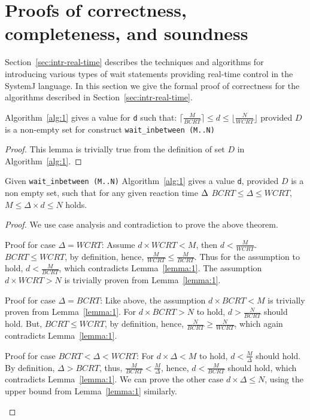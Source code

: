 \section{Proofs of correctness, completeness, and soundness}
\label{sec:proof-correctness}

Section~\ref{sec:intr-real-time} describes the techniques and algorithms
for introducing various types of wait statements providing real-time
control in the SystemJ language. In this section we give the formal
proof of correctness for the algorithms described in
Section~\ref{sec:intr-real-time}.

\begin{lemma}
  Algorithm~\ref{alg:1} gives a value for \texttt{d} such that: $\lceil
  \frac{M}{BCRT} \rceil \leq d \leq \lfloor \frac{N}{WCRT} \rfloor$
  provided $D$ is a non-empty set for construct \texttt{wait\_inbetween
    (M..N)}
\label{lemma:1}
\end{lemma}
\begin{proof}
  This lemma is trivially true from the definition of set $D$ in
  Algorithm~\ref{alg:1}.
\end{proof}

\begin{theorem}
  Given \texttt{wait\_inbetween (M..N)} Algorithm~\ref{alg:1} gives a
  value \texttt{d}, provided $D$ is a non empty set, such that for any
  given reaction time $\textcolor{black}{\Delta}$  $BCRT \leq
  \Delta \leq WCRT$, $M \leq \Delta \times d \leq N$ holds.
\label{th:1}
\end{theorem}
\begin{proof}
  We use case analysis and contradiction to prove the above theorem.
  \begin{compactenum}[\hspace{0.25cm} 1.]
  \item Proof for case $\Delta = WCRT$: Assume \mbox{$d \times WCRT <
      M$}, then $d < \frac{M}{WCRT}$. $BCRT \leq WCRT$, by definition,
    hence, $\frac{M}{WCRT} \leq \frac{M}{BCRT}$. Thus for the assumption
    to hold, $d < \frac{M}{BCRT}$, which contradicts
    Lemma~\ref{lemma:1}. The assumption $d \times WCRT >N$ is trivially
    proven from Lemma~\ref{lemma:1}.
  \item Proof for case $\Delta = BCRT$: Like above, the assumption $d
    \times BCRT < M$ is trivially proven from Lemma~\ref{lemma:1}. For
    $d \times BCRT > N$ to hold, $d > \frac{N}{BCRT}$ should hold. But,
    $BCRT \leq WCRT$, by definition, hence, $\frac{N}{BCRT} \geq
    \frac{N}{WCRT}$, which again contradicts Lemma~\ref{lemma:1}.
  \item Proof for case $BCRT < \Delta < WCRT$: For $d \times \Delta < M$
    to hold, $d < \frac{M}{\Delta}$ should hold. By definition, $\Delta
    > BCRT$, thus, $\frac{M}{BCRT} < \frac{M}{\Delta}$, hence, $d <
    \frac{M}{BCRT}$ should hold, which contradicts Lemma~\ref{lemma:1}. We
    can prove the other case $d \times \Delta \leq N$, using the upper
    bound from Lemma~\ref{lemma:1} similarly.
  \end{compactenum}
\end{proof}

